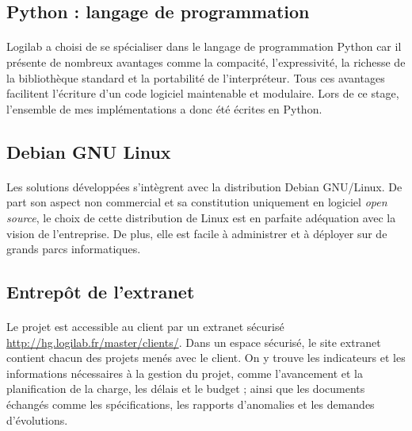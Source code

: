 \documentclass {report}
\begin{document}
\subsection{Python : langage de programmation}
\paragraph{}
Logilab a choisi de se spécialiser dans le langage de programmation Python car il présente de nombreux avantages comme la compacité, l'expressivité, la richesse de la bibliothèque standard et la portabilité de l’interpréteur. Tous ces avantages facilitent l’écriture d'un code logiciel maintenable et modulaire. Lors de ce stage, l'ensemble de mes implémentations a donc été écrites en Python.
\subsection{Debian GNU Linux}
\paragraph{}
Les solutions développées s'intègrent avec la distribution Debian GNU/Linux. De part son aspect non commercial et sa constitution uniquement en logiciel \textit{open source}, le choix de cette distribution de Linux est en parfaite adéquation avec la vision de l'entreprise. De plus, elle est facile à administrer et à déployer sur de grands parcs informatiques.

\subsection{Entrepôt de l'extranet}
\paragraph{}
Le projet est accessible au client par un extranet sécurisé \url{http://hg.logilab.fr/master/clients/}.  Dans un espace sécurisé, le site extranet contient chacun des projets menés avec le client. On y trouve les indicateurs et les informations nécessaires à la gestion du projet, comme l’avancement et la planification de la charge, les délais et le budget ; ainsi que les documents échangés comme les spécifications, les rapports d’anomalies et les demandes d’évolutions.
\end{document}
